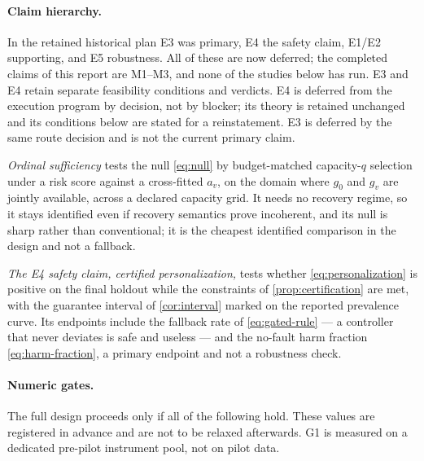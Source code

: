 \paragraph{Claim hierarchy.}
In the retained historical plan E3 was primary, E4 the safety claim, E1/E2
supporting, and E5 robustness.  All of these are now deferred; the completed
claims of this report are M1--M3, and none of the studies below has run.  E3 and
E4 retain separate feasibility conditions and verdicts.  E4 is deferred from
the execution program by decision, not by blocker; its theory is
retained unchanged and its conditions below are stated for a reinstatement.
E3 is deferred by the same route decision and is not the current primary claim.

\emph{Ordinal sufficiency} tests the null \eqref{eq:null} by budget-matched
capacity-$q$ selection under a risk score against a cross-fitted $a_v$, on the
domain where $g_0$ and $g_v$ are jointly available, across a declared capacity
grid.  It needs no recovery regime, so it stays identified even if recovery
semantics prove incoherent, and its null is sharp rather than conventional; it
is the cheapest identified comparison in the design and not a fallback.

\emph{The E4 safety claim, certified personalization,} tests whether
\eqref{eq:personalization} is positive on the final holdout while the constraints of \cref{prop:certification}
are met, with the guarantee interval of \cref{cor:interval} marked on the
reported prevalence curve.  Its endpoints include the fallback rate of
\eqref{eq:gated-rule} --- a controller that never deviates is safe and useless
--- and the no-fault harm fraction \eqref{eq:harm-fraction}, a primary endpoint
and not a robustness check.

\paragraph{Numeric gates.}
The full design proceeds only if all of the following hold.  These values are
registered in advance and are not to be relaxed afterwards.  G1 is measured on
a dedicated pre-pilot instrument pool, not on pilot data.

